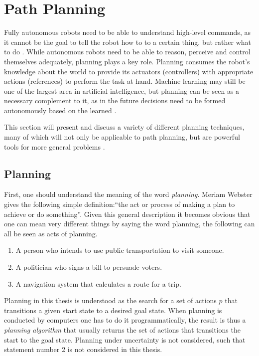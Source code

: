 \chapter{Path Planning}
\label{chap:pathPlanning}
Fully autonomous robots need to be able to understand high-level commands, as it cannot be the goal to tell the robot how to to a certain thing, but rather what to do \cite{Latombe.1991}. While autonomous robots need to be able to reason, perceive and control themselves adequately, planning plays a key role. Planning consumes the robot's knowledge about the world to provide its actuators (controllers) with appropriate actions (references) to perform the task at hand. Machine learning may still be one of the largest area in artificial intelligence, but planning can be seen as a necessary complement to it, as in the future decisions need to be formed autonomously based on the learned \cite{LaValle.2006}. 

This section will present and discuss a variety of different planning techniques, many of which will not only be applicable to path planning, but are powerful tools for more general problems \cite{LaValle.2006}.

\section{Planning}
First, one should understand the meaning of the word \emph{planning}. Meriam Webster gives the following simple definition:``the act or process of making a plan to achieve or do something''. Given this general description it becomes obvious that one can mean very different things by saying the word planning, the following can all be seen as acts of planning.
\begin{enumerate}
	\item A person who intends to use public transportation to visit someone.
	\item A politician who signs a bill to persuade voters.
	\item A navigation system that calculates a route for a trip.
\end{enumerate}

Planning in this thesis is understood as the search for a set of actions $p$ that transitions a given start state to a desired goal state. When planning is conducted by computers one has to do it programmatically, the result is thus a \emph{planning algorithm} that usually returns the set of actions that transitions the start to the goal state. Planning under uncertainty is not considered, such that statement number 2 is not considered in this thesis.

